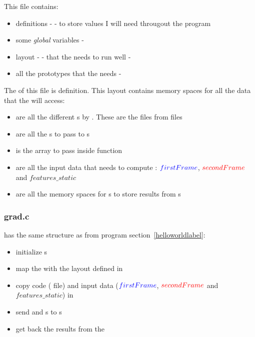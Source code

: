 This file contains:
\begin{itemize}
	\item {} definitions -  - to store values I will need througout the program
	\item some \emph{global} variables - 
	\item \ram{} layout -  - that the  needs to run well - 
	\item all the  prototypes that the \api{} needs - 
\end{itemize}

The  of this file is  definition. This layout contains \ram{} memory spaces for all the data that the \vc{} will access:
\begin{itemize}
	\item {} are all the different s by \vc{}. These are the  files from  files
	\item {} are all the \uni{}s to pass to \qpu{}s
	\item {} is the  array to pass inside  function
	\item {} are all the input data that \vc{} needs to compute \flow: $\textcolor{blue}{firstFrame}$, $\textcolor{red}{secondFrame}$ and $features\_static$
	\item {} are all the \ram{} memory spaces for \qpu{}s to store results from s
\end{itemize}


\subsubsection{grad.c}

 has the same structure as  from  program section~\ref{helloworldlabel}:
\begin{itemize}
	\item initialize \qpu{}s
	\item map the \ram{} with the layout defined in 
	\item copy code ( file) and input data ($\textcolor{blue}{firstFrame}$, $\textcolor{red}{secondFrame}$ and $features\_static$) in \ram
	\item send   and \uni{}s to \qpu{}s
	\item get back the results from the \ram
\end{itemize}

